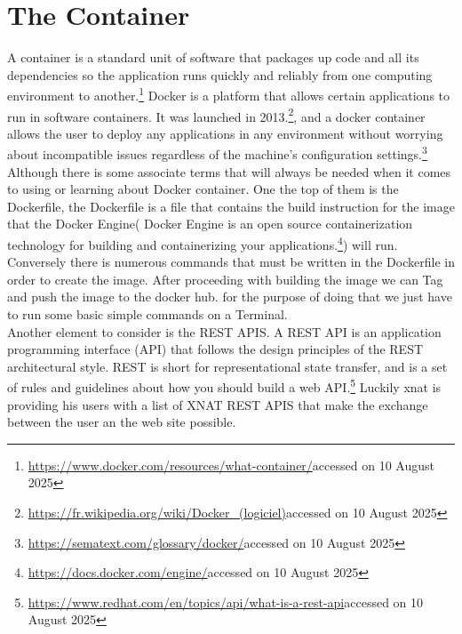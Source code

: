 \section{The Container}
A container is a standard unit of software that packages up code and all its dependencies so the application runs quickly and reliably from one computing environment to another.\footnote{\url{https://www.docker.com/resources/what-container/}accessed on 10 August 2025}
Docker is a platform that allows certain applications to run in software containers. It was launched in 2013.\footnote{\url{https://fr.wikipedia.org/wiki/Docker\_(logiciel)}accessed on 10 August 2025}, and a docker container allows the user to deploy any applications in any environment without worrying about incompatible issues regardless of the machine’s configuration settings.\footnote{\url{https://sematext.com/glossary/docker/}accessed on 10 August 2025} Although there is some associate terms that will always be needed when it comes to using or learning about Docker container.
One the top of them is the Dockerfile, the Dockerfile is a file that contains the build instruction for the image that the Docker Engine( Docker Engine is an open source containerization technology for building and containerizing your applications.\footnote{\url{https://docs.docker.com/engine/}accessed on 10 August 2025}) will run. Conversely there is numerous commands that must be written in the Dockerfile in order to create the image. After proceeding with building the image we can Tag and push the image to the docker hub. for the purpose of doing that we just have to run some basic simple commands on a Terminal.\\
Another element to consider is the REST APIS. A REST API is an application programming interface (API) that follows the design principles of the REST architectural style. REST is short for representational state transfer, and is a set of rules and guidelines about how you should build a web API.\footnote{\url{https://www.redhat.com/en/topics/api/what-is-a-rest-api}accessed on 10 August 2025} Luckily xnat is providing his users with a list of XNAT REST APIS that make the exchange between the user an the web site possible. 

